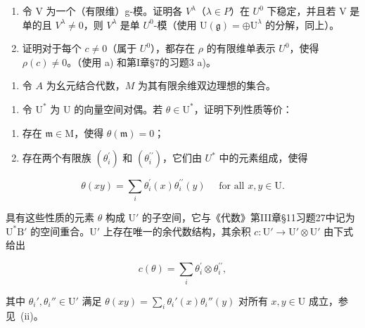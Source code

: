 \begin{enumerate}
\def\labelenumi{\alph{enumi})}
\item
  令 V 为一个（有限维）g-模。证明各 \(V^{\lambda}\)（\(\lambda \in P\)）在 \(U^{0}\) 下稳定，并且若 V 是单的且 \(V^{\lambda} \neq 0\)，则 \(V^{\lambda}\) 是单 \(U^{0}\)-模（使用 \(\mathrm{U}(\mathfrak{g}) = \oplus\mathrm{U}^{\lambda}\) 的分解，同上）。
\item
  证明对于每个 \(c \neq 0\)（属于 \(U^{0}\)），都存在 \(\rho\) 的有限维单表示 \(U^{0}\)，使得 \(\rho(c) \neq 0\)。（使用 a) 和第I章§7的习题3 a)。
\end{enumerate}

\begin{enumerate}
\def\labelenumi{\arabic{enumi})}
\setcounter{enumi}{23}
\tightlist
\item
  令 \(A\) 为幺元结合代数，\(M\) 为其有限余维双边理想的集合。
\end{enumerate}

\begin{enumerate}
\def\labelenumi{\alph{enumi})}
\tightlist
\item
  令 \(\mathrm{U}^*\) 为 U 的向量空间对偶。若 \(\theta \in \mathrm{U}^*\)，证明下列性质等价：
\end{enumerate}

\begin{enumerate}
\def\labelenumi{(\roman{enumi})}
\item
  存在 \(\mathfrak{m} \in \mathrm{M}\)，使得 \(\theta(\mathfrak{m}) = 0\)；
\item
   存在两个有限族 \((\theta_{i}^{\prime})\) 和 \((\theta_{i}^{\prime\prime})\)，它们由 \(U^{*}\) 中的元素组成，使得
\end{enumerate}

\[
\theta (x y) = \sum_ {i} \theta_ {i} ^ {\prime} (x) \theta_ {i} ^ {\prime \prime} (y) \quad \text { for   all } x, y \in \mathrm{U}.
\]

具有这些性质的元素 \(\theta\) 构成 \(\mathrm{U}'\) 的子空间，它与《代数》第III章§11习题27中记为 \(\mathrm{U}^*\)\(\mathrm{B}'\) 的空间重合。\(\mathrm{U}'\) 上存在唯一的余代数结构，其余积 \(c: \mathrm{U}' \to \mathrm{U}' \otimes \mathrm{U}'\) 由下式给出

\[
c (\theta) = \sum_ {i} \theta_ {i} ^ {\prime} \otimes \theta_ {i} ^ {\prime \prime},
\]

其中 \(\theta_i', \theta_i'' \in \mathrm{U}'\) 满足 \(\theta(xy) = \sum_{i} \theta_i'(x) \theta_i''(y)\) 对所有 \(x, y \in \mathrm{U}\) 成立，参见~(ii)。

